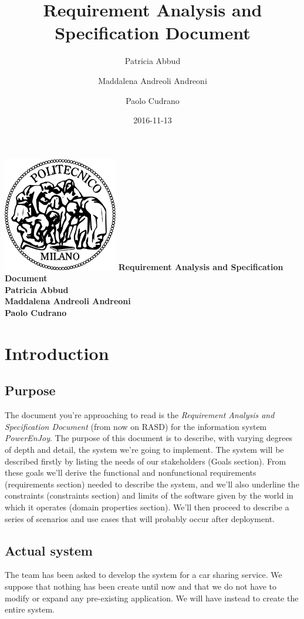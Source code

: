 \documentclass{article}
\title{Requirement Analysis and Specification Document}
\date{2016-11-13}
\author{
	Patricia Abbud
	\and
	Maddalena Andreoli Andreoni
	\and
	Paolo Cudrano
}
\begin{document}
	\begin{titlepage}
		\centering
		\includegraphics[width=5cm]{img/polimi_logo.png} %
		\vfill
		{\bfseries\Large
			Requirement Analysis and Specification Document\\
			\vskip4cm
			Patricia Abbud\\
			Maddalena Andreoli Andreoni\\
			Paolo Cudrano\\
		}
		\vfill
		\vfill
	\end{titlepage}

	\tableofcontents
	\newpage

	\section{Introduction}
		\subsection{Purpose}
			The document you're approaching to read is the \textit{Requirement Analysis and Specification Document} (from now on RASD) for the information system \textit{PowerEnJoy}. The purpose of this document is to describe, with varying degrees of depth and detail, the system we're going to implement. The system will be described firstly by listing the needs of our stakeholders (Goals section). From these goals we'll derive the functional and nonfunctional requirements (requirements section) needed to describe the system, and we'll also underline the constraints (constraints section) and limits of the software given by the world in which it operates (domain properties section). We'll then proceed to describe a series of scenarios and use cases that will probably occur after deployment.  
			
		\subsection{Actual system}
			The team has been asked to develop the system for a car sharing service. We suppose that nothing has been create until now and that we do not have to modify or expand any pre-existing application. We will have instead to create the entire system.
		
\end{document}
